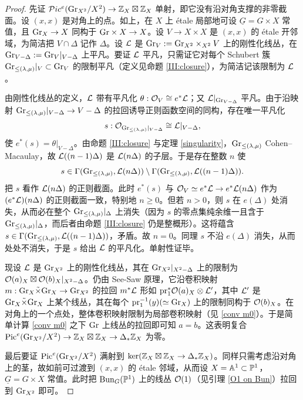 \begin{proof}
先证 ${\mathcal P} ic^e({\operatorname{Gr}}_{X^2}/X^2)\to  {\mathbb Z}_X\boxtimes{\mathbb Z}_X$ 单射，即它没有沿对角支撑的非零截面。设 $(x,x)$ 是对角上的点。如上，在 $X$ 上 \'etale 局部地可设 $\underline G=G\times X$ 常值，且 ${\operatorname{Gr}}_{X}\to X$ 同构于 ${\operatorname{Gr}}\times X\to X$。设 $V\to X\times X$ 是 $(x,x)$ 的 \'etale 开邻域，为简洁把 $V\cap\Delta$ 记作 $\Delta$。设 ${\mathcal L}$ 是 ${\operatorname{Gr}}_V:={\operatorname{Gr}}_{X^2}\times_{X^2}V$ 上的刚性化线丛，在 ${\operatorname{Gr}}_{V-\Delta}:={\operatorname{Gr}}_V|_{V-\Delta}$ 上平凡。要证 ${\mathcal L}$ 平凡，只需证它对每个 Schubert 簇 ${\operatorname{Gr}}_{\leq({\lambda},\mu)}|_V\subset {\operatorname{Gr}}_V$ 的限制平凡（定义见命题 \ref{III:closure}），为简洁记该限制为 ${\mathcal L}$。

由刚性化线丛的定义，${\mathcal L}$ 带有平凡化 $\theta: {\mathcal O}_{V}\cong e^*{\mathcal L}$；又 ${\mathcal L}|_{{\operatorname{Gr}}_{V-\Delta}}$ 平凡。由于沿映射 ${\operatorname{Gr}}_{\leq({\lambda},\mu)}|_{V-\Delta}\to V-\Delta$ 的拉回诱导正则函数空间的同构，存在唯一平凡化
\[s:  {\mathcal O}_{{\operatorname{Gr}}_{\leq({\lambda},\mu)}|_{V-\Delta}}\cong {\mathcal L}|_{V-\Delta},\]
使 $e^*(s)=\theta|_{V-\Delta}$。由命题 \ref{III:closure} 与定理 \ref{singularity}，${\operatorname{Gr}}_{\leq({\lambda},\mu)}$ Cohen--Macaulay，故 ${\mathcal L}((n-1)\Delta)$ 是 ${\mathcal L}(n\Delta)$ 的子层。于是存在整数 $n$ 使
\[s\in \Gamma({\operatorname{Gr}}_{\leq({\lambda},\mu)},{\mathcal L}(n\Delta))\setminus \Gamma({\operatorname{Gr}}_{\leq({\lambda},\mu)},{\mathcal L}((n-1)\Delta)).\]
把 $s$ 看作 ${\mathcal L}(n\Delta)$ 的正则截面。此时 $e^*(s)$ 与 ${\mathcal O}_V\simeq e^*{\mathcal L}\to e^*{\mathcal L}(n\Delta)$ 作为 $(e^*{\mathcal L})(n\Delta)$ 的正则截面一致，特别地 $n\geq 0$。但若 $n>0$，则 $s$ 在 $e(\Delta)$ 处消失，从而必在整个 ${\operatorname{Gr}}_{\leq ({\lambda},\mu)}|_\Delta$ 上消失（因为 $s$ 的零点集纯余维一且含于 ${\operatorname{Gr}}_{\leq ({\lambda},\mu)}|_\Delta$，而后者由命题 \ref{III:closure} 仍是整概形）。这将蕴含 $s\in \Gamma({\operatorname{Gr}}_{\leq({\lambda},\mu)},{\mathcal L}((n-1)\Delta))$，矛盾。故 $n=0$。同理 $s$ 不沿 $e(\Delta)$ 消失，从而处处不消失，于是 $s$ 给出 ${\mathcal L}$ 的平凡化。单射性证毕。

现设 ${\mathcal L}$ 是 ${\operatorname{Gr}}_{X^2}$ 上的刚性化线丛，其在 ${\operatorname{Gr}}_{X^2}|_{X^2-\Delta}$ 上的限制为 ${\mathcal O}(a)_X\boxtimes{\mathcal O}(b)_X|_{X^2-\Delta}$。仍由 See-Saw 原理，它沿卷积映射 $m: {\operatorname{Gr}}_X\tilde\times{\operatorname{Gr}}_X\to {\operatorname{Gr}}_{X^2}$ 的拉回 $m^*{\mathcal L}$ 形如 ${\operatorname{pr}}_1^*{\mathcal O}(a)_X\otimes {\mathcal L}'$，其中 ${\mathcal L}'$ 是 ${\operatorname{Gr}}_X\tilde\times{\operatorname{Gr}}_X$ 上某个线丛，其在每个 ${\operatorname{pr}}_1^{-1}(y)(\simeq {\operatorname{Gr}}_X)$ 上的限制同构于 ${\mathcal O}(b)_X$。在对角上的一个点处，整体卷积映射限制为局部卷积映射（见 \eqref{conv m0}）。于是简单计算 \eqref{conv m0} 之下 ${\operatorname{Gr}}$ 上线丛的拉回即可知 $a=b$。这表明复合 ${\operatorname{Pic}}^e({\operatorname{Gr}}_{X^2}/X^2)\to {\mathbb Z}_X\boxtimes{\mathbb Z}_X\to \Delta_*{\mathbb Z}_X$ 为零。

最后要证 ${\operatorname{Pic}}^e({\operatorname{Gr}}_{X^2}/X^2)$ 满射到 $\ker({\mathbb Z}_X\boxtimes{\mathbb Z}_X\to\Delta_*{\mathbb Z}_X)$。同样只需考虑沿对角上的茎，故如前可过渡到 $(x,x)$ 的 \'etale 邻域，从而设 $X={\mathbb A}^1\subset {\mathbb P}^1$，$\underline G=G\times X$ 常值。此时把 ${\operatorname{Bun}}_G({\mathbb P}^1)$ 上的线丛 ${\mathcal O}(1)$（见引理 \ref{O1 on Bun}）拉回到 ${\operatorname{Gr}}_{X^2}$ 即可。
\end{proof}

